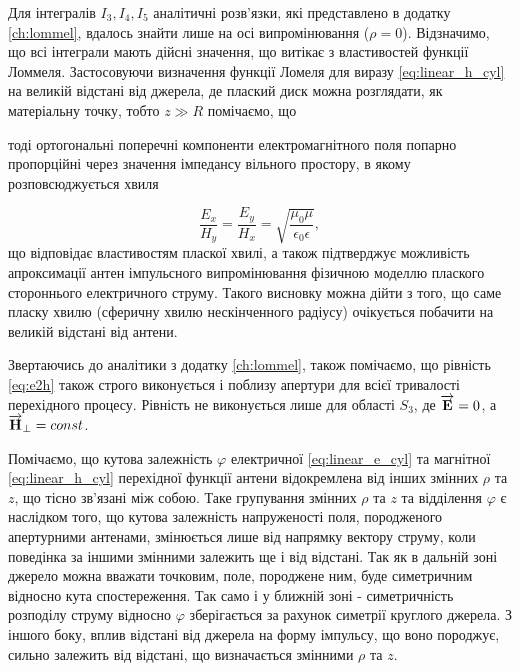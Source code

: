 Для інтегралів $ I_3, I_4, I_5 $ аналітичні розв'язки, які представлено в 
додатку \ref{ch:lommel}, вдалось знайти лише на осі випромінювання 
($ \rho = 0 $). Відзначимо, що всі інтеграли мають дійсні значення, що витікає
з властивостей функції Ломмеля. Застосовуючи визначення функції Ломеля для  
виразу \eqref{eq:linear_h_cyl} на великій відстані від джерела, де плаский 
диск можна розглядати, як матеріальну точку, тобто $ z \gg R $ помічаємо, що 

%
тоді ортогональні поперечні компоненти електромагнітного поля попарно 
пропорційні через значення імпедансу вільного простору, в якому 
розповсюджується хвиля

\begin{equation} \label{eq:e2h}
\frac{E_x}{H_y} = \frac{E_y}{H_x} = 
\sqrt{\frac{\mu_0 \mu}{\epsilon_0 \epsilon}},
\end{equation}
%
що відповідає властивостям пласкої хвилі, а також підтверджує можливість 
апроксимації антен імпульсного випромінювання фізичною моделлю плаского 
стороннього електричного струму. Такого висновку можна дійти з того, що
саме пласку хвилю (сферичну хвилю нескінченного радіусу) очікується побачити 
на великій відстані від антени.

Звертаючись до аналітики з додатку \ref{ch:lommel}, також помічаємо, що 
рівність \eqref{eq:e2h} також строго виконується і поблизу апертури для 
всієї тривалості перехідного процесу. Рівність не виконується лише для 
області $ S_3 $, де $ \overrightarrow{\mathbf E} = 0 $, а $ \overrightarrow{\mathbf H}_\perp = const $.

Помічаємо, що кутова залежність $ \varphi $ електричної 
\eqref{eq:linear_e_cyl} та магнітної \eqref{eq:linear_h_cyl} перехідної 
функції антени відокремлена від інших змінних $ \rho $ та $ z $, що тісно 
зв'язані між собою. Таке групування змінних $ \rho $ та $ z $ та відділення 
$ \varphi $ є наслідком того, що кутова залежність напруженості поля, 
породженого апертурними антенами, змінюється лише від напрямку вектору 
струму, коли поведінка за іншими змінними залежить ще і від відстані.
Так як в дальній зоні джерело можна вважати точковим, поле, породжене ним, 
буде симетричним відносно кута спостереження. Так само і у ближній зоні -
симетричність розподілу струму відносно $ \varphi $ зберігається за рахунок
симетрії круглого джерела. З іншого боку, вплив відстані від джерела на 
форму імпульсу, що воно породжує, сильно залежить від відстані, що 
визначається змінними $ \rho $ та $ z $.

